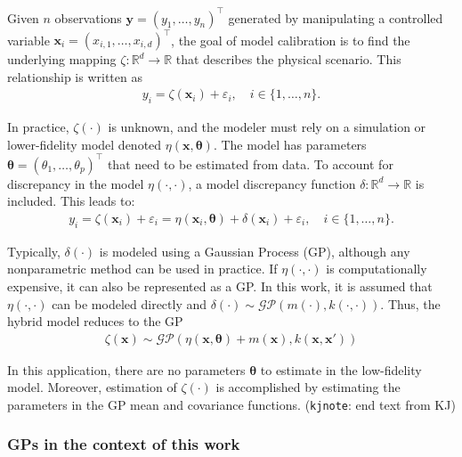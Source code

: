 \documentclass[journal=jacsat,manuscript=article]{achemso}
\newcommand{\kjnote}[1]{{\color{Blue} (\texttt{kjnote}: #1)}}
\newcommand{\xvec}{\ensuremath{\mathbf{x}}}
\begin{document}
 Given $n$ observations $\mathbf{y}=(y_1,\dots,y_n)^\intercal$ generated by manipulating a controlled variable $\xvec_i = (x_{i,1},\dots,x_{i,d})^\intercal$, the goal of model calibration is to find the underlying mapping $\zeta: \mathbb{R}^d \rightarrow \mathbb{R}$ that describes the physical scenario. This relationship is written as
 \begin{gather}
     y_i = \zeta(\mathbf{x}_i) + \varepsilon_i, \quad i \in \{1,\dots,n\}. \label{eq: trueprocess}
 \end{gather}

 In practice, $\zeta(\cdot)$ is unknown, and the modeler must rely on a simulation or lower-fidelity model denoted $\eta(\mathbf{x}, \boldsymbol{\theta})$. The model has parameters $\boldsymbol{\theta}=(\theta_1,\dots,\theta_p)^\intercal$ that need to be estimated from data. To account for discrepancy in the model $\eta(\cdot,\cdot)$, a model discrepancy function $\delta: \mathbb{R}^d \rightarrow \mathbb{R}$ is included. This leads to:
 \begin{gather}
      y_i = \zeta(\mathbf{x}_i) + \varepsilon_i = \eta(\mathbf{x}_i,\boldsymbol{\theta}) + \delta(\mathbf{x}_i) + \varepsilon_i, \quad i \in \{1,\dots,n\}.
 \end{gather}

 Typically, $\delta(\cdot)$ is modeled using a Gaussian Process (GP), although any nonparametric method can be used in practice. If $\eta(\cdot,\cdot)$ is computationally expensive, it can also be represented as a GP. In this work, it is assumed that $\eta(\cdot,\cdot)$ can be modeled directly and $\delta(\cdot)\sim \mathcal{GP}(m(\cdot),k(\cdot,\cdot))$. Thus, the hybrid model reduces to the GP
 \begin{gather}
     \zeta(\mathbf{x}) \sim \mathcal{GP}(\eta(\mathbf{x},\boldsymbol{\theta}) + m(\mathbf{x}), k(\mathbf{x}, \mathbf{x}'))
 \end{gather}

 In this application, there are no parameters $\boldsymbol{\theta}$ to estimate in the low-fidelity model. Moreover, estimation of $\zeta(\cdot)$ is accomplished by estimating the parameters in the GP mean and covariance functions.
\kjnote{end text from KJ}





\subsubsection{GPs in the context of this work}
\end{document}

